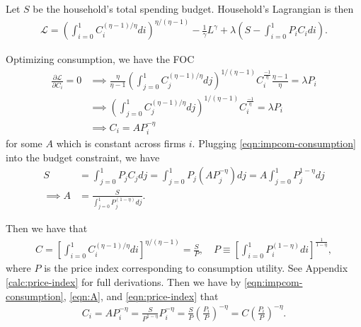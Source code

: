 \documentclass{article}
\renewcommand{\L}{\mathcal{L}}
\newcommand{\?}{\textcolor{red}{(?)}} %
\begin{document}
        Let $S$ be the household's total spending budget. Household's Lagrangian is then
        \begin{align}
            \L = \left(
                    \int_{i=0}^1 C_i^{(\eta - 1)/\eta} di
                \right)^{\eta / (\eta - 1)}
            - \frac{1}{\gamma} L^{\gamma}
            +\lambda \left(
                S - \int_{i=0}^1 P_i C_i di
            \right).
        \end{align}
        
        Optimizing consumption, we have the FOC
        \begin{align}
            \frac{\partial \L}{\partial C_i} = 0
            &\implies 
            \frac{\eta}{\eta - 1} \left(
                    \int_{j=0}^1 C_j^{(\eta - 1)/\eta} dj
                \right)^{1 / (\eta - 1)} C_i^{\frac{- 1}{\eta}} \frac{\eta - 1}{\eta}
            = \lambda P_i
            \\
            &\implies
            \left(
                    \int_{j=0}^1 C_j^{(\eta - 1)/\eta} dj
                \right)^{1 / (\eta - 1)} C_i^{\frac{- 1}{\eta}}
            = \lambda P_i
            \\
            &\implies
            C_i = A P_i^{-\eta}
            \label{eqn:impcom-consumption}
        \end{align}
        for some $A$ which is constant across firms $i$. Plugging \eqref{eqn:impcom-consumption} into the budget constraint,
        we have
        \begin{align}
            S &= \int_{j=0}^1 P_j C_j dj
            = \int_{j=0}^1 P_j (A  P_j^{-\eta}) dj
            = A \int_{j=0}^1 P_j^{1-\eta} dj
            \\ \implies
            A &= \frac{S}{\int_{j=0}^1 P_j^{(1-\eta)} dj}.
            \label{eqn:A}
        \end{align}
        
        Then we have that
        \begin{align}
            C
            = \left[
                    \int_{i=0}^1 C_i^{(\eta - 1)/\eta} di
                \right]^{\eta / (\eta - 1)}
            = \frac{S}{P}, \quad P \equiv \left[
                \int_{i=0}^1
                P_i^{(1-\eta)}
                di
                \right]^{\frac{1}{1 - \eta}},
                \label{eqn:price-index}
        \end{align}
        where $P$ is the price index corresponding to consumption utility. See Appendix \eqref{calc:price-index} for full derivations. Then we have by \eqref{eqn:impcom-consumption}, \eqref{eqn:A}, and \eqref{eqn:price-index} that
        \begin{align}
            C_i = A P_i^{-\eta}
            = \frac{S}{P^{1-\eta}} P_i^{-\eta}
            = \frac{S}{P} \left(\frac{P_i}{P}\right)^{-\eta}
            = C \left(\frac{P_i}{P}\right)^{-\eta}.
            \label{eqn:consumption-demand}
        \end{align}
    
\end{document}
